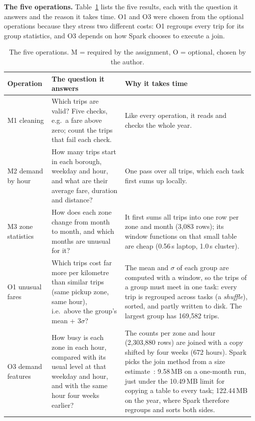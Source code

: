 \documentclass[sigconf]{acmart}
\newcommand{\s}{\,s}
\begin{document}
\textbf{The five operations.} Table~\ref{tab:ops} lists the five results, each with the
question it answers and the reason it takes time. O1 and O3 were chosen from the optional
operations because they stress two different costs: O1 regroups every trip for its group
statistics, and O3 depends on how Spark chooses to execute a join.

\begin{table}[t]
\caption{The five operations. M = required by the assignment, O = optional, chosen by the author.}
\label{tab:ops}
\footnotesize
\begin{tabularx}{\textwidth}{@{}>{\raggedright\arraybackslash}p{1.9cm}>{\raggedright\arraybackslash}p{5.6cm}X@{}}
\toprule
Operation & The question it answers & Why it takes time \\
\midrule
M1 cleaning & Which trips are valid? Five checks, e.g.\ a fare above zero; count the trips that fail each check. & Like every operation, it reads and checks the whole year. \\
M2 demand by hour & How many trips start in each borough, weekday and hour, and what are their average fare, duration and distance? & One pass over all trips, which each task first sums up locally. \\
M3 zone statistics & How does each zone change from month to month, and which months are unusual for it? & It first sums all trips into one row per zone and month (3,083 rows); its window functions on that small table are cheap (0.56\s{} laptop, 1.0\s{} cluster). \\
O1 unusual fares & Which trips cost far more per kilometre than similar trips (same pickup zone, same hour), i.e.\ above the group's mean + 3$\sigma$? & The mean and $\sigma$ of each group are computed with a window, so the trips of a group must meet in one task: every trip is regrouped across tasks (a \emph{shuffle}), sorted, and partly written to disk. The largest group has 169,582 trips. \\
O3 demand features & How busy is each zone in each hour, compared with its usual level at that weekday and hour, and with the same hour four weeks earlier? & The counts per zone and hour (2,303,880 rows) are joined with a copy shifted by four weeks (672 hours). Spark picks the join method from a size estimate~\cite{armbrust2015}: 9.58\,MB on a one-month run, just under the 10.49\,MB limit for copying a table to every task; 122.44\,MB on the year, where Spark therefore regroups and sorts both sides. \\
\bottomrule
\end{tabularx}
\end{table}
\end{document}
